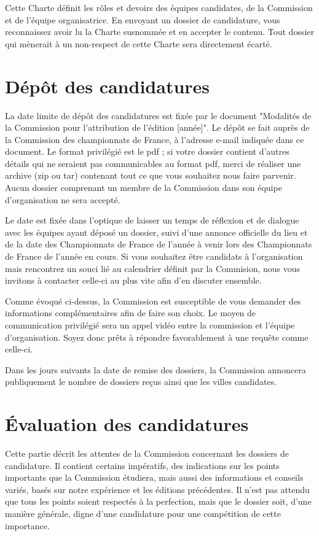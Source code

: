 \documentclass[a4paper,12pt]{scrartcl}
\begin{document}
Cette Charte définit les rôles et devoirs des équipes candidates, de la Commission et de l'équipe organisatrice. En envoyant un dossier de candidature, vous reconnaissez avoir lu la Charte susnommée et en accepter le contenu. Tout dossier qui mènerait à un non-respect de cette Charte sera directement écarté.


\section*{Dépôt des candidatures}

La date limite de dépôt des candidatures est fixée par le document "Modalités de la Commission pour l'attribution de l'édition [année]". Le dépôt se fait auprès de la Commission des championnats de France, à l'adresse e-mail indiquée dans ce document. Le format privilégié est le pdf ; si votre dossier contient d'autres détails qui ne seraient pas communicables au format pdf, merci de réaliser une archive (zip ou tar) contenant tout ce que vous souhaitez nous faire parvenir. Aucun dossier comprenant un membre de la Commission dans son équipe d'organisation ne sera accepté.

Le date est fixée dans l'optique de laisser un temps de réflexion et de dialogue avec les équipes ayant déposé un dossier, suivi d'une annonce officielle du lieu et de la date des Championnats de France de l'année à venir lors des Championnats de France de l'année en cours. Si vous souhaitez être candidats à l'organisation mais rencontrez un souci lié au calendrier définit par la Commision, nous vous invitons à contacter celle-ci au plus vite afin d'en discuter ensemble.

Comme évoqué ci-dessus, la Commission est susceptible de vous demander des informations complémentaires afin de faire son choix. Le moyen de communication privilégié sera un appel vidéo entre la commission et l'équipe d'organisation. Soyez donc prêts à répondre favorablement à une requête comme celle-ci.

Dans les jours suivants la date de remise des dossiers, la Commission annoncera publiquement le nombre de dossiers reçus ainsi que les villes candidates.

\pagebreak
\section*{Évaluation des candidatures}

Cette partie décrit les attentes de la Commission concernant les dossiers de candidature. Il contient certains impératifs, des indications sur les points importants que la Commission étudiera, mais aussi des informations et conseils variés, basés sur notre expérience et les éditions précédentes. Il n'est pas attendu que tous les points soient respectés à la perfection, mais que le dossier soit, d'une manière générale, digne d'une candidature pour une compétition de cette importance.
\end{document}
